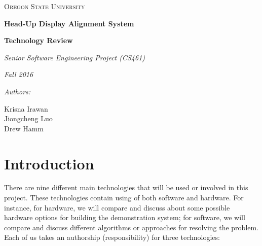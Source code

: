 \documentclass[letterpaper,10pt,onecolumn]{IEEEtran}
\def\name{Krisna Irawan\\ Jiongcheng Luo\\ Drew Hamm}
\def\doc{Technology Review}
\begin{document}
\begin{titlepage}
	\centering
	{\scshape\LARGE Oregon State University\par}
	\vspace{2cm}
	{\huge\bfseries Head-Up Display Alignment System\par}
	\vspace{1cm}
	{\Large\bfseries \doc\par}
	\vspace{1cm}
	{\Large\itshape Senior Software Engineering Project (CS461)\par}
	{\Large\itshape Fall 2016\par}
	\vspace{1cm}
	{\normalsize\itshape Authors:\par}
	{\normalsize \name\par}
	\vspace{1cm}
	\vspace{3cm}


	\begin{abstract}
		This project is a proof concept to explore a potential technological innovation for Head-Up Display (HUD) system that present critical flight information to pilots. The primary objective of this project is to reduce the cost and time required to precisely align flight information to the HUD by introducing additional sensor to the system to make the alignment process more dynamic. To achieve this goal, there are nine different main technologies that will be critical for the development of the project. This document will compare three alternative options for each main technologies. This document will also include the option that we choose for each main technologies to develop this project. 

	\end{abstract}
\end{titlepage}
\tableofcontents

\newpage
\section{Introduction}
There are nine different main technologies that will be used or involved in this project. These technologies contain using of both software and hardware. For instance, for hardware, we will compare and discuss about some possible hardware options for building the demonstration system; for software, we will compare and discuss different algorithms or approaches for resolving the problem. Each of us takes an authorship (responsibility) for three technologies:\\
\end{document}
